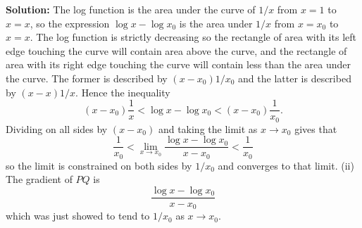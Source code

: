 \documentclass{article}
\newcommand{\solution}[1]{\setlength{\hangindent}{\parindent} \indent\indent \textbf{Solution: }#1\hfill\break}
\begin{document}
\solution{The log function is the area under the curve of $1/x$ from $x=1$ to $x=x$, so the expression $\log x - \log x_0$ is the area under $1/x$ from $x=x_0$ to $x=x$. The log function is strictly decreasing so the rectangle of area with its left edge touching the curve will contain area above the curve, and the rectangle of area with its right edge touching the curve will contain less than the area under the curve. The former is described by $(x-x_0) 1/x_0$ and the latter is described by $(x-x) 1/x$. Hence the inequality
$$(x-x_0)\frac{1}{x} < \log x - \log x_0 < (x-x_0) \frac{1}{x_0}.$$
Dividing on all sides by $(x-x_0)$ and taking the limit as $x\to x_0$ gives that 
$$\frac{1}{x_0} < \lim_{x\to x_0} \frac{\log x - \log x_0}{x-x_0} < \frac{1}{x_0}$$
so the limit is constrained on both sides by $1/x_0$ and converges to that limit.
\indent (ii) The gradient of $PQ$ is 
$$\frac{\log x - \log x_0}{x-x_0}$$ 
which was just showed to tend to $1/x_0$ as $x\to x_0$.}%

\newpage
\end{document}
